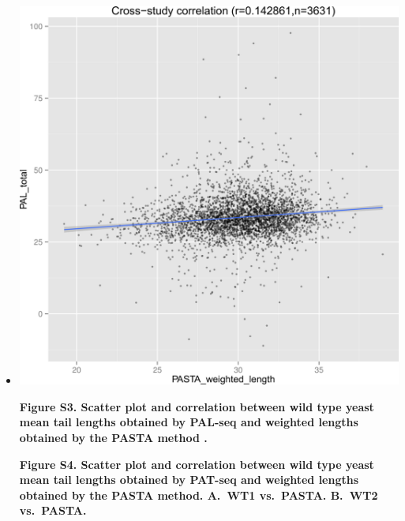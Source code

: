 \documentclass[10pt]{article}
\begin{document}
\begin{itemize}
	
\item[]{
\includegraphics[scale=0.8]{FigureS3.png}

\textbf{Figure S3. Scatter plot and correlation between wild type yeast mean tail lengths obtained by PAL-seq \cite{subtelny14} and weighted lengths obtained by the PASTA method \cite{beilharz07}. }
}





\textbf{Figure S4. Scatter plot and correlation between wild type yeast mean tail lengths obtained by PAT-seq and weighted lengths obtained by the PASTA method. \textbf{A.}~WT1 vs.\ PASTA. \textbf{B.}~WT2 vs.\ PASTA. }

\end{itemize}
\end{document}
